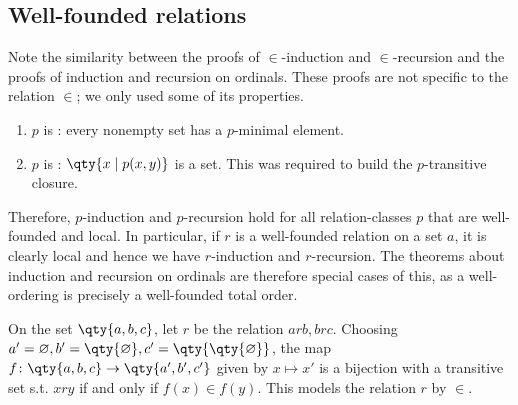 \subsection{Well-founded relations}
Note the similarity between the proofs of $\in$-induction and $\in$-recursion and the proofs of induction and recursion on ordinals.
These proofs are not specific to the relation $\in$; we only used some of its properties.
\begin{enumerate}
    \item $p$ is : every nonempty set has a $p$-minimal element.
    \item $p$ is : $\qty{x \mid p(x,y)}$ is a set.
    This was required to build the $p$-transitive closure.
\end{enumerate}
Therefore, $p$-induction and $p$-recursion hold for all relation-classes $p$ that are well-founded and local.
In particular, if $r$ is a well-founded relation on a set $a$, it is clearly local and hence we have $r$-induction and $r$-recursion.
The theorems about induction and recursion on ordinals are therefore special cases of this, as a well-ordering is precisely a well-founded total order.

On the set $\qty{a, b, c}$, let $r$ be the relation $arb, brc$.
Choosing $a' = \varnothing, b' = \qty{\varnothing}, c' = \qty{\qty{\varnothing}}$, the map $f \colon \qty{a, b, c} \to \qty{a', b', c'}$ given by $x \mapsto x'$ is a bijection with a transitive set s.t. $xry$ if and only if $f(x) \in f(y)$.
This models the relation $r$ by $\in$.

